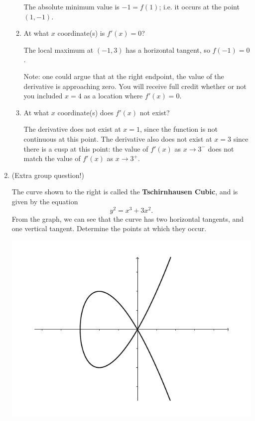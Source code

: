 \documentclass[12pt]{article}
\newcommand{\points}[1]{\marginpar{\hspace{24pt}[#1]}}
\begin{document}
\begin{enumerate}
\begin{enumerate}
\medskip

The absolute minimum value is $-1=f(1)$; i.e. it occurs at the point $(1,-1)$.

\medskip

\item At what $x$ coordinate(s) is $f'(x)=0$?

\medskip

The local maximum at $(-1,3)$ has a horizontal tangent, so $f(-1)=0$.

Note: one could argue that at the right endpoint, the value of the derivative is approaching zero. You will receive full credit whether or not you included $x=4$ as a location where $f'(x)=0$.

\medskip

\item At what $x$ coordinate(s) does $f'(x)$ not exist?

\medskip

The derivative does not exist at $x=1$, since the function is not continuous at this point. The derivative also does not exist at $x=3$ since there is a cusp at this point: the value of $f'(x)$ as $x\to 3^-$ does not match the value of $f'(x)$ as $x\to 3^+$.
\end{enumerate}


\newpage


\item (Extra group question!) \points{2}
\begin{multicols}{2}
The curve shown to the right is called the \textbf{Tschirnhausen Cubic}, and is given by the equation
\[
y^2=x^3+3x^2.
\]
From the graph, we can see that the curve has two horizontal tangents, and one vertical tangent. Determine the points at which they occur.

\begin{center}
\includegraphics[width=\columnwidth]{TT3_fig2}
\end{center}
\end{multicols}


\end{enumerate}
\end{document}

